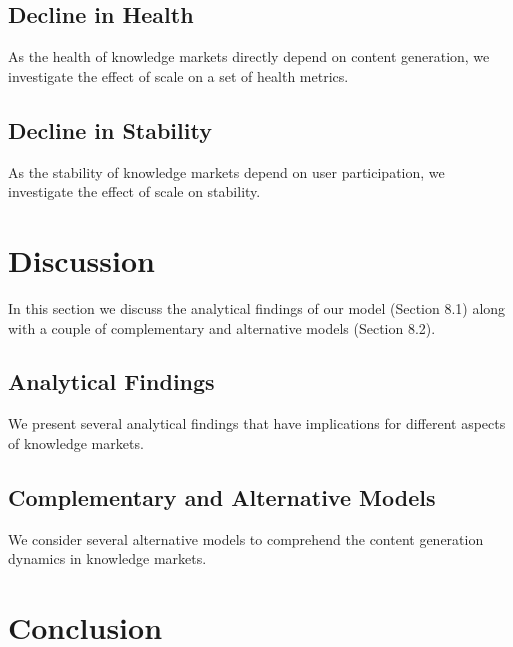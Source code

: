 \documentclass[sigconf]{acmart}
\begin{document}
\subsection{Decline in Health}
As the health of knowledge markets directly depend on content generation, we investigate the effect of scale on a set of health metrics.
\subsection{Decline in Stability}
As the stability of knowledge markets depend on user participation, we investigate the effect of scale on stability.

\section{Discussion}
In this section we discuss the analytical findings of our model (Section 8.1) along with a couple of complementary and alternative models (Section 8.2).
\subsection{Analytical Findings}
We present several analytical findings that have implications for different aspects of knowledge markets.
\subsection{Complementary and Alternative Models}
We consider several alternative models to comprehend the content generation dynamics in knowledge markets.

\section{Conclusion}


\end{document}
